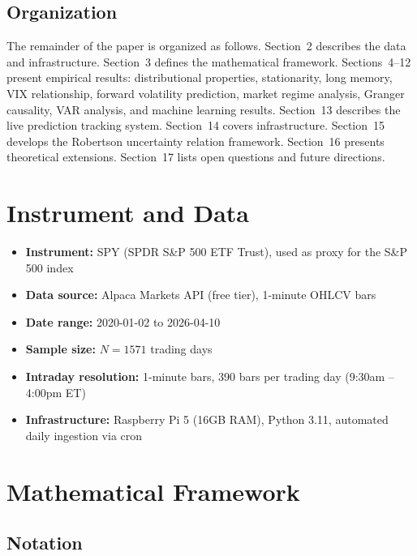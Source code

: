 \documentclass[11pt]{article}
\begin{document}
\subsection{Organization}

The remainder of the paper is organized as follows. Section~2 describes the data and infrastructure. Section~3 defines the mathematical framework. Sections~4--12 present empirical results: distributional properties, stationarity, long memory, VIX relationship, forward volatility prediction, market regime analysis, Granger causality, VAR analysis, and machine learning results. Section~13 describes the live prediction tracking system. Section~14 covers infrastructure. Section~15 develops the Robertson uncertainty relation framework. Section~16 presents theoretical extensions. Section~17 lists open questions and future directions.

\section{Instrument and Data}

\begin{itemize}
    \item \textbf{Instrument:} SPY (SPDR S\&P 500 ETF Trust), used as proxy for the S\&P 500 index
    \item \textbf{Data source:} Alpaca Markets API (free tier), 1-minute OHLCV bars
    \item \textbf{Date range:} 2020-01-02 to 2026-04-10
    \item \textbf{Sample size:} $N = 1571$ trading days
    \item \textbf{Intraday resolution:} 1-minute bars, 390 bars per trading day (9:30am -- 4:00pm ET)
    \item \textbf{Infrastructure:} Raspberry Pi 5 (16GB RAM), Python 3.11, automated daily ingestion via cron
\end{itemize}

\section{Mathematical Framework}

\subsection{Notation}
\end{document}
